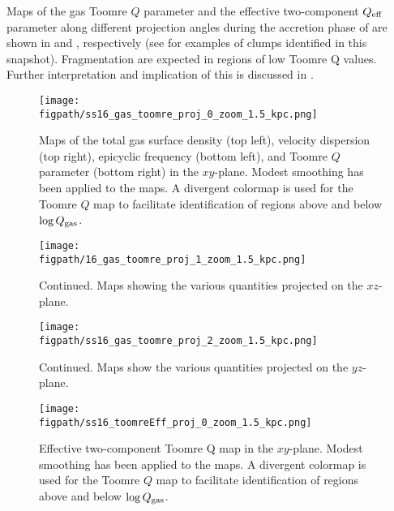 \IfFileExists{emulateapjlegacy.cls}{\documentclass[iop]{emulateapjlegacy}}{\documentclass[iop]{emulateapj}}
\def\figpath{./Fig}
\begin{document}
Maps of the gas Toomre $Q$ parameter and the effective two-component $Q_{\rm eff}$ parameter along different projection angles during the accretion phase of \flower are shown in  and , respectively (see  for examples of clumps identified 
in this snapshot). Fragmentation are expected in regions of low Toomre Q values.
Further interpretation and implication of this is discussed in .


\begin{figure*}[htbp]
\centering
\texttt{[image: \\figpath/ss16\_gas\_toomre\_proj\_0\_zoom\_1.5\_kpc.png]}
\caption{
Maps of the total gas surface density (top left), 
velocity dispersion (top right),
epicyclic frequency (bottom left), 
and Toomre $Q$ parameter (bottom right) in the $xy$-plane.
Modest smoothing has been applied to the maps. 
A divergent colormap is used for the Toomre $Q$ map to facilitate 
identification of regions above and below $\log{Q_{\rm gas}}$.
\label{fig:Q}}
\addtocounter{figure}{-1}
\end{figure*}

\begin{figure*}[htbp]
\centering
\texttt{[image: \\figpath/16\_gas\_toomre\_proj\_1\_zoom\_1.5\_kpc.png]}
\caption{Continued. Maps showing the various quantities projected on the $xz$-plane.}
\addtocounter{figure}{-1}
\end{figure*}

\begin{figure*}[htbp]
\centering
\texttt{[image: \\figpath/ss16\_gas\_toomre\_proj\_2\_zoom\_1.5\_kpc.png]}
\caption{Continued. Maps show the various quantities projected on the $yz$-plane.}
\end{figure*}



\begin{figure*}[htbp]
\centering
\texttt{[image: \\figpath/ss16\_toomreEff\_proj\_0\_zoom\_1.5\_kpc.png]}
\caption{
Effective two-component Toomre Q map in the $xy$-plane.
Modest smoothing has been applied to the maps. 
A divergent colormap is used for the Toomre $Q$ map to facilitate 
identification of regions above and below $\log{Q_{\rm gas}}$.
\label{fig:Qeff}}
\end{figure*}



\end{document}
